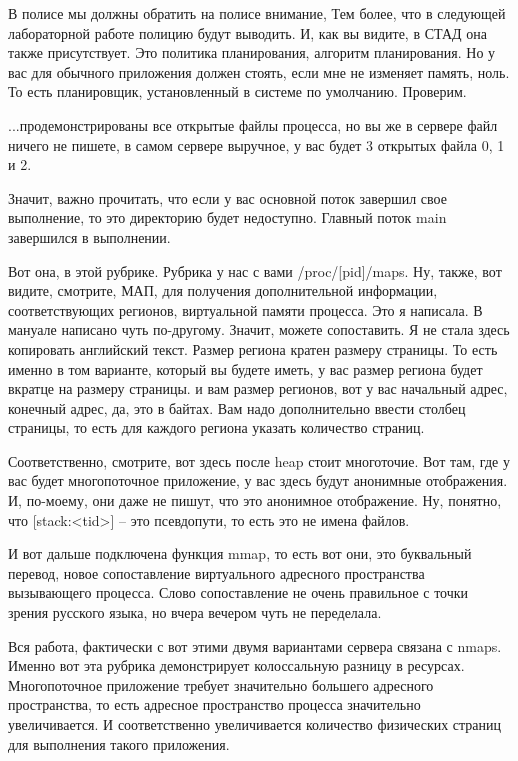 \documentclass[12pt]{article} %
\begin{document}

В полисе мы должны обратить на полисе внимание,  Тем более, что в следующей лабораторной работе полицию будут выводить.  И, как вы видите, в СТАД она также присутствует.  Это политика планирования, алгоритм планирования.  Но у вас для обычного приложения должен стоять, если мне не изменяет память, ноль.  То есть планировщик, установленный в системе по умолчанию.  Проверим.  

...продемонстрированы все открытые файлы процесса, но вы же в сервере файл ничего не пишете, в самом сервере выручное, у вас будет 3 открытых файла 0, 1 и 2.  

Значит, важно прочитать, что если у вас основной поток завершил свое выполнение, то это директорию будет недоступно.  Главный поток main завершился в выполнении.   

Вот она, в этой рубрике. Рубрика у нас с вами /proc/[pid]/maps.  Ну, также, вот видите, смотрите, МАП, для получения дополнительной информации, соответствующих регионов, виртуальной памяти процесса.  Это я написала. В мануале написано чуть по-другому.  Значит, можете сопоставить.  Я не стала здесь копировать английский текст.  Размер региона кратен размеру страницы.  То есть именно в том варианте, который вы будете иметь, у вас размер региона будет вкратце на размеру страницы.  и вам размер регионов, вот у вас начальный адрес, конечный адрес, да, это в байтах.  Вам надо дополнительно ввести столбец страницы, то есть для каждого региона указать количество страниц.

Соответственно, смотрите, вот здесь после heap стоит многоточие.  Вот там, где у вас будет многопоточное приложение, у вас здесь будут анонимные отображения.  И, по-моему, они даже не пишут, что это анонимное отображение.  Ну, понятно, что [stack:<tid>] – это псевдопути, то есть это не имена файлов.  

И вот дальше подключена функция mmap, то есть вот они, это буквальный перевод, новое сопоставление виртуального адресного пространства вызывающего процесса.  Слово сопоставление не очень правильное с точки зрения русского языка, но вчера вечером чуть не переделала.

Вся работа, фактически с вот этими двумя вариантами сервера связана с nmaps. Именно вот эта рубрика демонстрирует колоссальную разницу в ресурсах.  Многопоточное приложение требует значительно большего адресного пространства, то есть адресное пространство процесса значительно увеличивается.  И соответственно увеличивается количество физических страниц для выполнения такого приложения.
\end{document}
